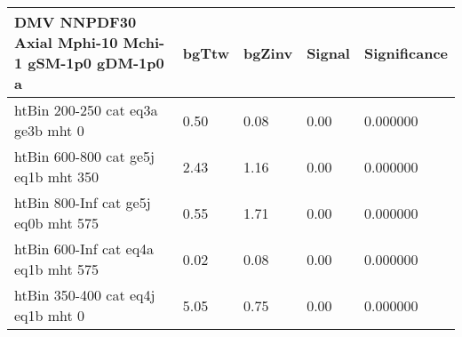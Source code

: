  \begin{tabular}{|l|l|l|l|l|}
\small
   \label{mostSensitiveBins_DMV_NNPDF30_Axial_Mphi-10_Mchi-1_gSM-1p0_gDM-1p0_25ns}
   \textbf{DMV NNPDF30 Axial Mphi-10 Mchi-1 gSM-1p0 gDM-1p0}	 a& 	bgTtw	 & 	bgZinv	 & 	Signal &	 Significance \\ 
	\hline
	htBin 200-250 cat eq3a ge3b mht 0 & 	0.50	 & 	0.08	 & 	0.00 	&0.000000 \\ 
	htBin 600-800 cat ge5j eq1b mht 350 & 	2.43	 & 	1.16	 & 	0.00 	&0.000000 \\ 
	htBin 800-Inf cat ge5j eq0b mht 575 & 	0.55	 & 	1.71	 & 	0.00 	&0.000000 \\ 
	htBin 600-Inf cat eq4a eq1b mht 575 & 	0.02	 & 	0.08	 & 	0.00 	&0.000000 \\ 
	htBin 350-400 cat eq4j eq1b mht 0 & 	5.05	 & 	0.75	 & 	0.00 	&0.000000 \\ 
\end{tabular}
